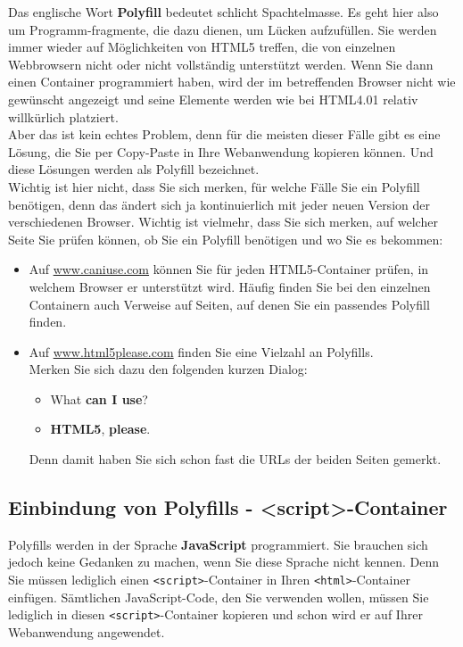 Das englische Wort \textbf{Polyfill} bedeutet schlicht Spachtelmasse. Es geht hier also um Programm-fragmente, die dazu dienen, um Lücken aufzufüllen. Sie werden immer wieder auf Möglichkeiten von HTML5 treffen, die von einzelnen Webbrowsern nicht oder nicht vollständig unterstützt werden. Wenn Sie dann einen Container programmiert haben, wird der im betreffenden Browser nicht wie gewünscht angezeigt und seine Elemente werden wie bei HTML4.01 relativ willkürlich platziert.\\

Aber das ist kein echtes Problem, denn für die meisten dieser Fälle gibt es eine Lösung, die Sie per Copy-Paste in Ihre Webanwendung kopieren können. Und diese Lösungen werden als Polyfill bezeichnet.\\

Wichtig ist hier nicht, dass Sie sich merken, für welche Fälle Sie ein Polyfill benötigen, denn das ändert sich ja kontinuierlich mit jeder neuen Version der verschiedenen Browser. Wichtig ist vielmehr, dass Sie sich merken, auf welcher Seite Sie prüfen können, ob Sie ein Polyfill benötigen und wo Sie es bekommen:

\begin{itemize}
	\item Auf \url{www.caniuse.com} können Sie für jeden HTML5-Container prüfen, in welchem Browser er unterstützt wird. Häufig finden Sie bei den einzelnen Containern auch Verweise auf Seiten, auf denen Sie ein passendes Polyfill finden.
	\item Auf \url{www.html5please.com} finden Sie eine Vielzahl an Polyfills.\\
	Merken Sie sich dazu den folgenden kurzen Dialog: 
	\begin{itemize}
		\item What \textbf{can I use}?
		\item \textbf{HTML5}, \textbf{please}.
	\end{itemize}
	Denn damit haben Sie sich schon fast die URLs der beiden Seiten gemerkt.
\end{itemize}

\subsection{Einbindung von Polyfills - <script>-Container}

Polyfills werden in der Sprache \textbf{JavaScript} programmiert. Sie brauchen sich jedoch keine Gedanken zu machen, wenn Sie diese Sprache nicht kennen. Denn Sie müssen lediglich einen \verb|<script>|-Container in Ihren \verb|<html>|-Container einfügen. Sämtlichen JavaScript-Code, den Sie verwenden wollen, müssen Sie lediglich in diesen \verb|<script>|-Container kopieren und schon wird er auf Ihrer Webanwendung angewendet.\\

